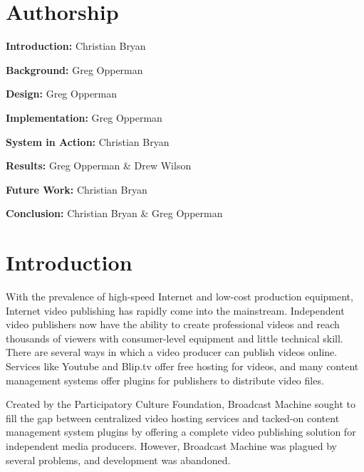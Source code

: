 \documentclass[a4paper,12pt]{report}
\begin{document}
\chapter*{Authorship}
\begin{description}
  \item{\textbf{Introduction: }Christian Bryan}
  \item{\textbf{Background: }Greg Opperman}
  \item{\textbf{Design: }Greg Opperman}
  \item{\textbf{Implementation: }Greg Opperman}
  \item{\textbf{System in Action: }Christian Bryan}
  \item{\textbf{Results: } Greg Opperman \& Drew Wilson}
  \item{\textbf{Future Work: }Christian Bryan}
    \item{\textbf{Conclusion: }Christian Bryan \& Greg Opperman}
\end{description}

\tableofcontents

\chapter{Introduction}
With the prevalence of high-speed Internet and low-cost production equipment, Internet video publishing has rapidly come into the 
mainstream. Independent video publishers now have the ability to create professional videos and reach thousands of viewers with consumer-level equipment and little technical skill. There are several ways in which a video producer can publish videos online. Services like Youtube and Blip.tv offer free hosting for videos, and many content management systems offer plugins for publishers to distribute video files.

Created by the Participatory Culture Foundation, Broadcast Machine sought to fill the gap between centralized video hosting services and tacked-on content management system plugins by offering a complete video publishing solution for independent media producers. However, Broadcast Machine was plagued by several problems, and development was abandoned.
\end{document}
